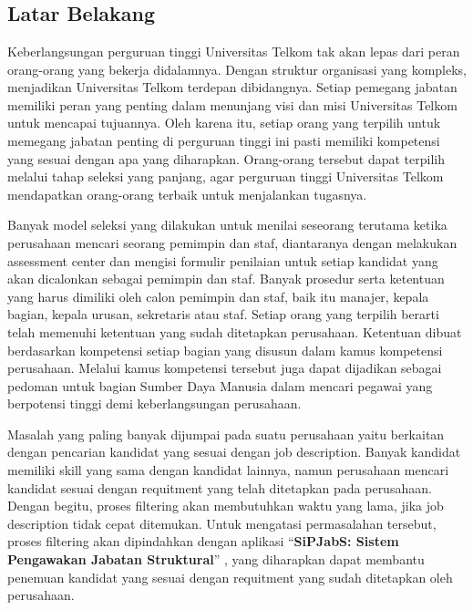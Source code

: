\chapter{\babSatu}
\section{Latar Belakang}
Keberlangsungan perguruan tinggi Universitas Telkom tak akan lepas dari peran orang-orang yang bekerja didalamnya. Dengan struktur organisasi yang kompleks, menjadikan Universitas Telkom terdepan dibidangnya. Setiap pemegang jabatan memiliki peran yang penting dalam menunjang visi dan misi Universitas Telkom untuk mencapai tujuannya. Oleh karena itu, setiap orang yang terpilih untuk memegang jabatan penting di perguruan tinggi ini pasti memiliki kompetensi yang sesuai dengan apa yang diharapkan. Orang-orang tersebut dapat terpilih melalui tahap seleksi yang panjang, agar perguruan tinggi Universitas Telkom mendapatkan orang-orang terbaik untuk menjalankan tugasnya.

Banyak model seleksi yang dilakukan untuk menilai seseorang terutama ketika perusahaan mencari seorang pemimpin dan staf, diantaranya dengan melakukan assessment center dan mengisi formulir penilaian untuk setiap kandidat yang akan dicalonkan sebagai pemimpin dan staf. Banyak prosedur serta ketentuan yang harus dimiliki oleh calon pemimpin dan staf, baik itu manajer, kepala bagian, kepala urusan, sekretaris atau staf. Setiap orang yang terpilih berarti telah memenuhi ketentuan yang sudah ditetapkan perusahaan. Ketentuan dibuat berdasarkan kompetensi setiap bagian yang disusun dalam kamus kompetensi perusahaan. Melalui kamus kompetensi tersebut juga dapat dijadikan sebagai pedoman untuk bagian Sumber Daya Manusia dalam mencari pegawai yang berpotensi tinggi demi keberlangsungan perusahaan.

Masalah yang paling banyak dijumpai pada suatu perusahaan yaitu berkaitan dengan pencarian kandidat yang sesuai dengan job description. Banyak kandidat memiliki skill yang sama dengan kandidat lainnya, namun perusahaan mencari kandidat sesuai dengan requitment yang telah ditetapkan pada perusahaan. Dengan begitu, proses filtering akan membutuhkan waktu yang lama, jika job description tidak cepat ditemukan. Untuk mengatasi permasalahan tersebut, proses filtering akan dipindahkan dengan aplikasi “\textbf{SiPJabS: Sistem Pengawakan Jabatan Struktural}” , yang diharapkan dapat membantu penemuan kandidat yang sesuai dengan requitment yang sudah ditetapkan oleh perusahaan.
\\

